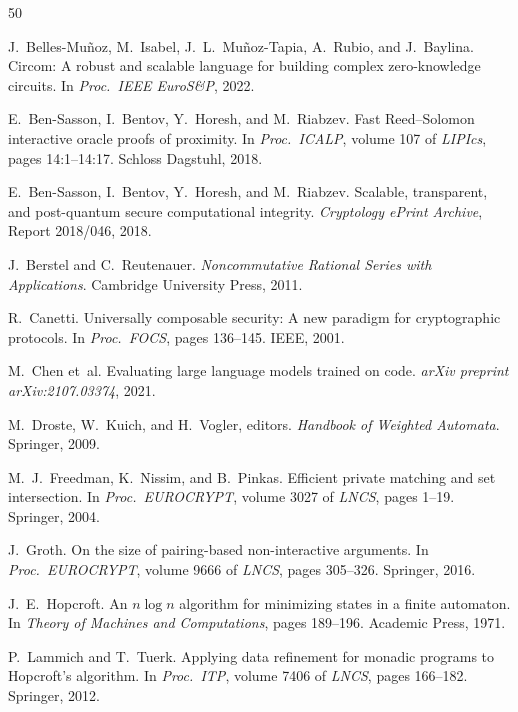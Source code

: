 \documentclass[11pt]{article}
\begin{document}
\begin{thebibliography}{50}

J.~Belles-Mu\~noz, M.~Isabel, J.~L.~Mu\~noz-Tapia, A.~Rubio, and
J.~Baylina.
\newblock Circom: A robust and scalable language for building complex
  zero-knowledge circuits.
\newblock In \emph{Proc.\ IEEE EuroS\&P}, 2022.

E.~Ben-Sasson, I.~Bentov, Y.~Horesh, and M.~Riabzev.
\newblock Fast {R}eed--{S}olomon interactive oracle proofs of proximity.
\newblock In \emph{Proc.\ ICALP}, volume 107 of \emph{LIPIcs}, pages
  14:1--14:17. Schloss Dagstuhl, 2018.

E.~Ben-Sasson, I.~Bentov, Y.~Horesh, and M.~Riabzev.
\newblock Scalable, transparent, and post-quantum secure computational
  integrity.
\newblock \emph{Cryptology ePrint Archive}, Report 2018/046, 2018.

J.~Berstel and C.~Reutenauer.
\newblock \emph{Noncommutative Rational Series with Applications}.
\newblock Cambridge University Press, 2011.

R.~Canetti.
\newblock Universally composable security: A new paradigm for cryptographic
  protocols.
\newblock In \emph{Proc.\ FOCS}, pages 136--145. IEEE, 2001.

M.~Chen et~al.
\newblock Evaluating large language models trained on code.
\newblock \emph{arXiv preprint arXiv:2107.03374}, 2021.

M.~Droste, W.~Kuich, and H.~Vogler, editors.
\newblock \emph{Handbook of Weighted Automata}.
\newblock Springer, 2009.

M.~J.~Freedman, K.~Nissim, and B.~Pinkas.
\newblock Efficient private matching and set intersection.
\newblock In \emph{Proc.\ EUROCRYPT}, volume 3027 of \emph{LNCS}, pages
  1--19. Springer, 2004.

J.~Groth.
\newblock On the size of pairing-based non-interactive arguments.
\newblock In \emph{Proc.\ EUROCRYPT}, volume 9666 of \emph{LNCS}, pages
  305--326. Springer, 2016.

J.~E.~Hopcroft.
\newblock An $n\log n$ algorithm for minimizing states in a finite automaton.
\newblock In \emph{Theory of Machines and Computations}, pages 189--196.
  Academic Press, 1971.

P.~Lammich and T.~Tuerk.
\newblock Applying data refinement for monadic programs to {Hopcroft}'s algorithm.
\newblock In \emph{Proc.\ ITP}, volume 7406 of \emph{LNCS}, pages 166--182.
  Springer, 2012.


\end{thebibliography}
\end{document}
